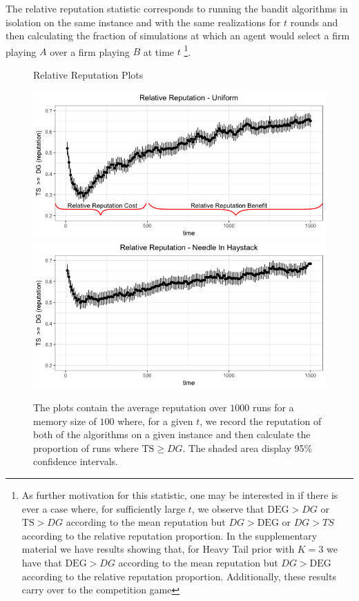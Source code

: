 \documentclass[letterpaper]{article}
\theoremstyle{definition}
\newcommand{\TS}{\mathrm{TS}}
\newcommand{\DEG}{\mathrm{DEG}}
\begin{document}
The relative reputation statistic corresponds to running the bandit algorithms in isolation on the same instance and with the same realizations for $t$ rounds and then calculating the fraction of simulations at which an agent would select a firm playing $A$ over a firm playing $B$ at time $t$ \footnote{As further motivation for this statistic, one may be interested in if there is ever a case where, for sufficiently large $t$, we observe that $\DEG >DG$ or $\TS > DG$ according to the mean reputation but $DG > \DEG$ or $DG > TS$ according to the relative reputation proportion. In the supplementary material we have results showing that, for Heavy Tail prior with $K=3$ we have that $\DEG > DG$ according to the mean reputation but $DG > \DEG$ according to the relative reputation proportion. Additionally, these results carry over to the competition game}.

\begin{figure}[ht]
\caption{Relative Reputation Plots}
\includegraphics[scale=0.35]{figures/relative_uniform_annotated_plot}
\includegraphics[scale=0.35]{figures/ts_dg_nih_10_prelim}
\caption*{\tiny{The plots contain the average reputation over $1000$ runs for a memory size of $100$ where, for a given $t$, we record the reputation of both of the algorithms on a given instance and then calculate the proportion of runs where $\TS \geq DG$. The shaded area display 95\% confidence intervals.}}
\label{relative_rep_plots}

\end{figure}
\end{document}
